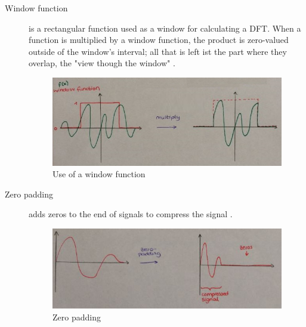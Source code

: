 \begin{description}
	\item[Window function] is a rectangular function used as a window for calculating a DFT. When a function is multiplied by a window function, the product is zero-valued outside of the window's interval; all that is left ist the part where they overlap, the "view though the window" .
		\begin{figure}[!h]
			\centering
			\includegraphics[width=0.7\linewidth]{images_LA/window}
			\caption{Use of a window function}
			\label{fig:window}
		\end{figure}
	
	\item[Zero padding] adds zeros to the end of signals to compress the signal .
		\begin{figure}[!h]
			\centering
			\includegraphics[width=0.7\linewidth]{images_LA/zerop}
			\caption{Zero padding}
			\label{fig:zerop}
		\end{figure}


	
\end{description}

